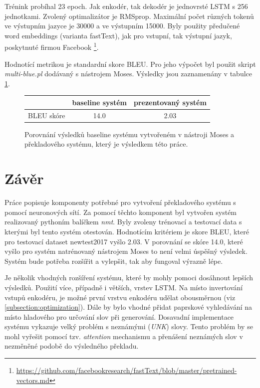 Trénink probíhal 23 epoch. Jak enkodér, tak dekodér je jednovrsté LSTM s 256 jednotkami. Zvolený optimalizátor je RMSprop. Maximální počet různých tokenů ve výstupním jazyce je 30000 a ve výstupním 15000. Byly použity předučené word embeddings (varianta fastText), jak pro vstupní, tak výstupní jazyk, poskytnuté firmou Facebook \footnote{\url{https://github.com/facebookresearch/fastText/blob/master/pretrained-vectors.md}}.

Hodnotící metrikou je standardní skore BLEU. Pro jeho výpočet byl použit skript \emph{multi-blue.pl} dodávaný s nástrojem Moses. Výsledky jsou zaznamenány v tabulce \ref{table:results}.


\begin{figure}[h]
    \begin{center}
        \begin{tabular}{c|c|c}
          & baseline systém & prezentovaný systém \\
          \hline
          BLEU skóre & 14.0 & 2.03\\
          \hline
        \end{tabular}
    \end{center}
	\caption{Porovnání výsledků baseline systému vytvořeném v nástroji Moses a překladového systému, který je výsledkem této práce.}
	\label{table:results}
\end{figure}



\chapter{Závěr}
Práce popisuje komponenty potřebné pro vytvoření překladového systému s pomocí neuronových sítí. Za pomocí těchto komponent byl vytvořen systém realizovaný pythoním balíčkem \emph{nmt}. Byly zvoleny trénovací a testovací data s kterými byl tento systém otestován. Hodnotícím kritériem je skore BLEU, které pro testovací dataset newtest2017 vyšlo 2.03. V porovnání se skóre 14.0, které vyšlo pro systém natrénovaný nástrojem Moses to není velmi úspěšný výsledek. Systém bude potřeba rozšířit a vylepšit, tak aby fungoval výrazně lépe.

Je několik vhodných rozšíření systému, které by mohly pomoci dosáhnout lepších výsledků. Použití více, případně i větších, vrstev LSTM. Na místo invertování vstupů enkodéru, je možné první vrstvu enkodéru udělat obousměrnou (viz \ref{subsection:optimization}). Dále by bylo vhodné přidat paprskové vyhledávání na místo hladového pro určování slov při generování. Dosavadní implementace systému vykazuje velký problém s neznámými (\emph{UNK}) slovy. Tento problém by se mohl vyřešit pomocí tzv. \emph{attention} mechanismu a přenášení neznámých slov v nezměněné podobě do výsledného překladu.

